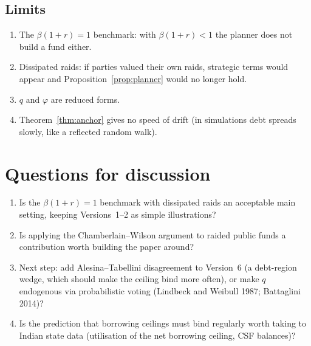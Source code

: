 \documentclass[11pt]{article}
\begin{document}
\subsection{Limits}
\begin{enumerate}
\item The $\beta(1+r)=1$ benchmark: with $\beta(1+r)<1$ the planner does not build a fund either.
\item Dissipated raids: if parties valued their own raids, strategic terms would appear and Proposition~\ref{prop:planner} would no longer hold.
\item $q$ and $\varphi$ are reduced forms.
\item Theorem~\ref{thm:anchor} gives no speed of drift (in simulations debt spreads slowly, like a reflected random walk).
\end{enumerate}

\section{Questions for discussion}
\begin{enumerate}
\item Is the $\beta(1+r)=1$ benchmark with dissipated raids an acceptable main setting, keeping Versions~1--2 as simple illustrations?
\item Is applying the Chamberlain--Wilson argument to raided public funds a contribution worth building the paper around?
\item Next step: add Alesina--Tabellini disagreement to Version~6 (a debt-region wedge, which should make the ceiling bind more often), or make $q$ endogenous via probabilistic voting (Lindbeck and Weibull 1987; Battaglini 2014)?
\item Is the prediction that borrowing ceilings must bind regularly worth taking to Indian state data (utilisation of the net borrowing ceiling, CSF balances)?
\end{enumerate}
\end{document}
